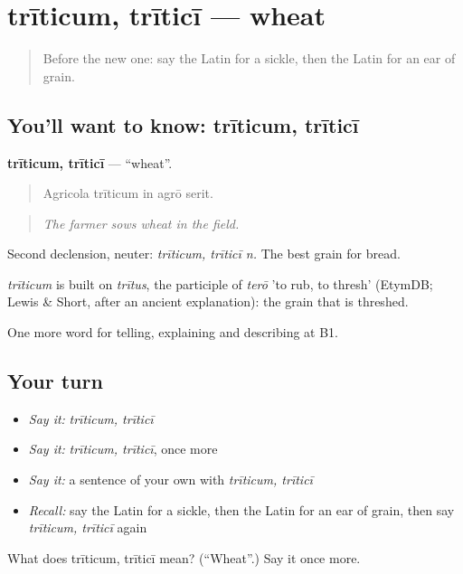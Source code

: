 \section[trīticum, trīticī]{trīticum, trīticī — wheat}

\label{lesson:LA-C475-triticum}



\begin{quote}
Before the new one: say the Latin for a sickle, then the Latin for an ear of grain.
\end{quote}

\subsection*{You'll want to know: trīticum, trīticī}
\textbf{trīticum, trīticī} — \textquotedblleft{}wheat\textquotedblright{}.

\begin{quote}
Agricola trīticum in agrō serit.
\end{quote}

\begin{quote}
\emph{The farmer sows wheat in the field.}
\end{quote}

Second declension, neuter: \emph{trīticum, trīticī n.} The best grain for bread.

\begin{cousinweb}
\emph{trīticum} is built on \emph{trītus}, the participle of \emph{terō} 'to rub, to thresh' (EtymDB; Lewis \& Short, after an ancient explanation): the grain that is threshed.
\end{cousinweb}

\begin{grammarlens}[title={What you've built}]
One more word for telling, explaining and describing at B1.
\end{grammarlens}

\subsection*{Your turn}
\begin{itemize}
\raggedright
  \item \emph{Say it:} \emph{trīticum, trīticī}
  \item \emph{Say it:} \emph{trīticum, trīticī}, once more
  \item \emph{Say it:} a sentence of your own with \emph{trīticum, trīticī}
  \item \emph{Recall:} say the Latin for a sickle, then the Latin for an ear of grain, then say \emph{trīticum, trīticī} again
\end{itemize}

\begin{tcolorbox}[breakable,colback=teal!4,colframe=teal!35!black,title={Before you move on}]
What does trīticum, trīticī mean? (\textquotedblleft{}Wheat\textquotedblright{}.) Say it once more.
\end{tcolorbox}

